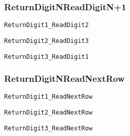\documentclass{article}
\begin{document}
    \subsubsection*{ReturnDigitNReadDigitN+1}

        \noindent\texttt{ReturnDigit1\_ReadDigit2}

        \noindent\texttt{ReturnDigit2\_ReadDigit3}

        \noindent\texttt{ReturnDigit3\_ReadDigit1}


    \subsubsection*{ReturnDigitNReadNextRow}

        \noindent\texttt{ReturnDigit1\_ReadNextRow}

        \noindent\texttt{ReturnDigit2\_ReadNextRow}

        \noindent\texttt{ReturnDigit3\_ReadNextRow}
\end{document}
